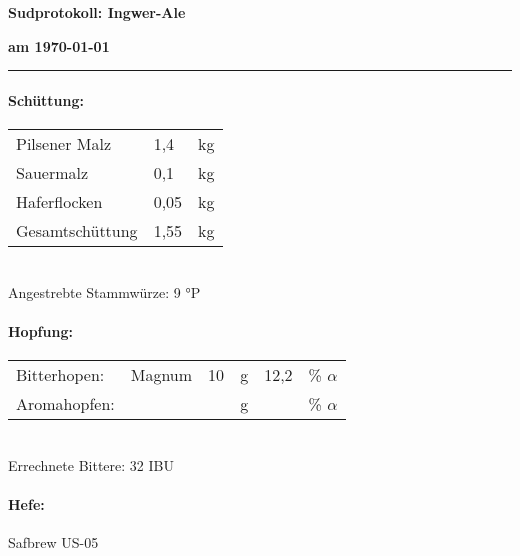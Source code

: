 \documentclass[12pt,oneside,a4paper]{scrartcl}
\begin{document}
	\begin{minipage}{0.70\textwidth}
		{\large\textbf{\hspace{-0.4cm}Sudprotokoll: Ingwer-Ale}}
	\end{minipage}
	\begin{minipage}[t]{0.29\textwidth}
		{\large\textbf{am \today}}
	\end{minipage}
	\rule{\textwidth}{1pt}
%
\paragraph{Schüttung:}
	\begin{tabular}[t]{m{8cm} m{2cm} m{1cm}}
		Pilsener Malz & 1,4 & kg\bigstrut\\
		Sauermalz & 0,1 & kg\bigstrut\\
		Haferflocken & 0,05 & kg \bigstrut\\ \hline
		Gesamtschüttung & 1,55 & kg\bigstrut
	\end{tabular}\\

\vspace{.25cm}
\hspace{1cm}Angestrebte Stammwürze: 9 °P
%
\paragraph{Hopfung:}
	\begin{tabular}[t]{m{2cm} m{5cm} m{0.5cm} m{1cm} m{0.5cm} m{1cm}}
		Bitterhopen: & Magnum & 10 & g & 12,2 & \% $\alpha$ \\
		Aromahopfen: & & & g & &  \% $\alpha$
	\end{tabular}\\

\vspace{.25cm}
\hspace{1cm}Errechnete Bittere: 32 IBU
%
\paragraph{Hefe:}
	Safbrew US-05
	
\end{document}
